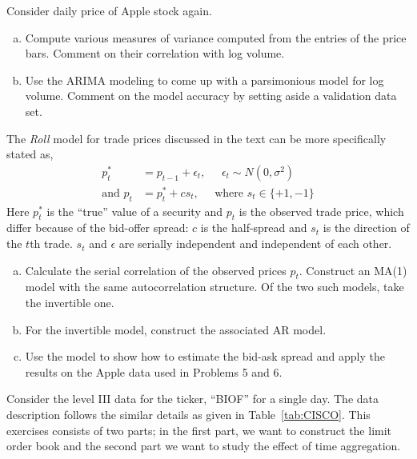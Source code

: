 \prob Consider daily price of Apple stock again.
\begin{enumerate}[(a)]
\item Compute various measures of variance computed from the entries of the price bars. Comment on their correlation with log volume. 
\item Use the ARIMA modeling to come up with a parsimonious model for log volume. Comment on the model accuracy by setting aside a validation data set. \twomedskip
\end{enumerate}


\prob The \textit{Roll} model for trade prices discussed in the text can be more specifically stated as,
	\[
	\begin{split}
	p_t^*&= p_{t-1} + \epsilon_t, \;\;\;\;\; \epsilon_t \sim N(0,\sigma^2) \\
	\text{and } p_t&= p_t^* + c s_t, \;\;\;\;\; \text{where }s_t \in \{+1,-1\}
	\end{split}
	\]
Here $p_t^*$ is the ``true'' value of a security and $p_t$ is the observed trade price, which differ because of the bid-offer spread: $c$ is the half-spread and $s_t$ is the direction of the $t$th trade. $s_t$ and $\epsilon$ are serially independent and independent of each other.
\begin{enumerate}[(a)]
\item Calculate the serial correlation of the observed prices $p_t$. Construct an MA(1) model with the same autocorrelation structure. Of the two such models, take the invertible one. 
\item For the invertible model, construct the associated AR model. 
\item Use the model to show how to estimate the bid-ask spread and apply the results on the Apple data used in Problems 5 and 6. \twomedskip
\end{enumerate}


\prob Consider the level III data for the ticker, ``BIOF'' for a single day. The data description follows the similar details as given in Table~\ref{tab:CISCO}. This exercises consists of two parts; in the first part, we want to construct the limit order book and the second part we want to study the effect of time aggregation. 

